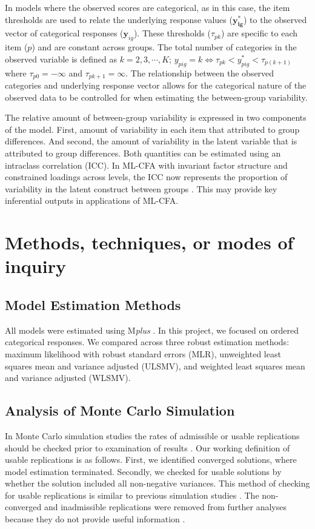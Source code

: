 \documentclass[man, noextraspace, 12pt]{apa7}
\begin{document}
In models where the observed scores are categorical, as in this case, the item thresholds are used to relate the underlying response values ($\mathbf{y^{*}_{ig}}$) to the observed vector of categorical responses ($\mathbf{y}_{ig}$).
These thresholds ($\tau_{pk}$) are specific to each item ($p$) and are constant across groups. 
The total number of categories in the observed variable is defined as $k = 2, 3, \cdots, K$; 
$y_{pig} = k \Leftrightarrow \tau_{pk} < y^{*}_{pig} < \tau_{p(k+1)}$ where $\tau_{p0} = -\infty$ and $\tau_{pk+1} = \infty$.
The relationship between the observed categories and underlying response vector allows for the categorical nature of the observed data to be controlled for when estimating the between-group variability.

The relative amount of between-group variability is expressed in two components of the model.
First, amount of variability in each item that attributed to group differences.
And second, the amount of variability in the latent variable that is attributed to group differences.
Both quantities can be estimated using an intraclass correlation (ICC).
In ML-CFA with invariant factor structure and constrained loadings across levels, the ICC now represents the proportion of variability in the latent construct between groups \citep[][, p. 155-171]{Heck2015}.
This may provide key inferential outputs in applications of ML-CFA.
\section{Methods, techniques, or modes of inquiry}

\subsection{Model Estimation Methods}
	
All models were estimated using M\textit{plus} \citep[version 8.2]{Muthen2017}. 
In this project, we focused on ordered categorical responses.
We compared across three robust estimation methods: maximum likelihood with robust standard errors (MLR), unweighted least squares mean and variance adjusted (ULSMV), and weighted least squares mean and variance adjusted (WLSMV).

\subsection{Analysis of Monte Carlo Simulation}
In Monte Carlo simulation studies the rates of admissible or usable replications should be checked prior to examination of results \citep{Bandalos2012}.
Our working definition of usable replications is as follows.
First, we identified converged solutions, where model estimation terminated.
Secondly, we checked for usable solutions by whether the solution included all non-negative variances.
This method of checking for usable replications is similar to previous simulation studies \citep{Yang2010, DiStefano2014}.
The non-converged and inadmissible replications were removed from further analyses because they do not provide useful information \citep{Bandalos2013}.
\end{document}
